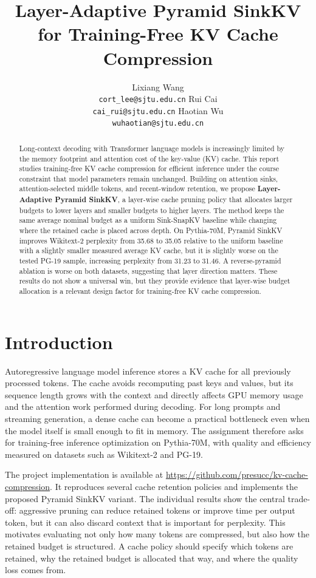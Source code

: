 \documentclass{article}
\title{Layer-Adaptive Pyramid SinkKV for Training-Free KV Cache Compression}
\author{
Lixiang Wang\\
\texttt{cort\_lee@sjtu.edu.cn}
\And
Rui Cai\\
\texttt{cai\_rui@sjtu.edu.cn}
\And
Haotian Wu\\
\texttt{wuhaotian@sjtu.edu.cn}
}
\begin{document}
\maketitle

\begin{abstract}
Long-context decoding with Transformer language models is increasingly limited by
the memory footprint and attention cost of the key-value (KV) cache. This report
studies training-free KV cache compression for efficient inference under the
course constraint that model parameters remain unchanged. Building on attention
sinks, attention-selected middle tokens, and recent-window retention, we propose
\textbf{Layer-Adaptive Pyramid SinkKV}, a layer-wise cache pruning policy that
allocates larger budgets to lower layers and smaller budgets to higher layers.
The method keeps the same average nominal budget as a uniform Sink-SnapKV
baseline while changing where the retained cache is placed across depth. On
Pythia-70M, Pyramid SinkKV improves Wikitext-2 perplexity from 35.68 to 35.05
relative to the uniform baseline with a slightly smaller measured average KV
cache, but it is slightly worse on the tested PG-19 sample, increasing
perplexity from 31.23 to 31.46. A reverse-pyramid ablation is worse on both
datasets, suggesting that layer direction matters. These results do not show a
universal win, but they provide evidence that layer-wise budget allocation is a
relevant design factor for training-free KV cache compression.
\end{abstract}

\section{Introduction}
\label{sec:intro}

Autoregressive language model inference stores a KV cache for all previously
processed tokens. The cache avoids recomputing past keys and values, but its
sequence length grows with the context and directly affects GPU memory usage and
the attention work performed during decoding. For long prompts and streaming
generation, a dense cache can become a practical bottleneck even when the model
itself is small enough to fit in memory. The assignment therefore asks for
training-free inference optimization on Pythia-70M, with quality and efficiency
measured on datasets such as Wikitext-2 and PG-19.

The project implementation is available at
\url{https://github.com/presucc/kv-cache-compression}. It reproduces several
cache retention policies and implements the proposed Pyramid SinkKV variant.
The individual results show the central trade-off: aggressive pruning
can reduce retained tokens or improve time per output token, but it can also
discard context that is important for perplexity. This motivates evaluating not
only how many tokens are compressed, but also how the retained budget is
structured. A cache policy should specify which tokens are retained, why the
retained budget is allocated that way, and where the quality loss comes from.
\end{document}
